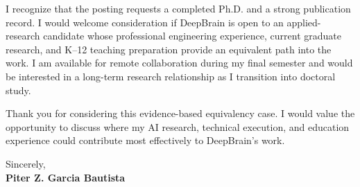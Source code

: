 \documentclass[11pt,letterpaper]{article}
\begin{document}
I recognize that the posting requests a completed Ph.D. and a strong
publication record. I would welcome consideration if DeepBrain is open to an
applied-research candidate whose professional engineering experience, current
graduate research, and K--12 teaching preparation provide an equivalent path
into the work. I am available for remote collaboration during my final
semester and would be interested in a long-term research relationship as I
transition into doctoral study.

Thank you for considering this evidence-based equivalency case. I would value
the opportunity to discuss where my AI research, technical execution, and
education experience could contribute most effectively to DeepBrain's work.

Sincerely,\\
\textbf{Piter Z. Garcia Bautista}
\end{document}
